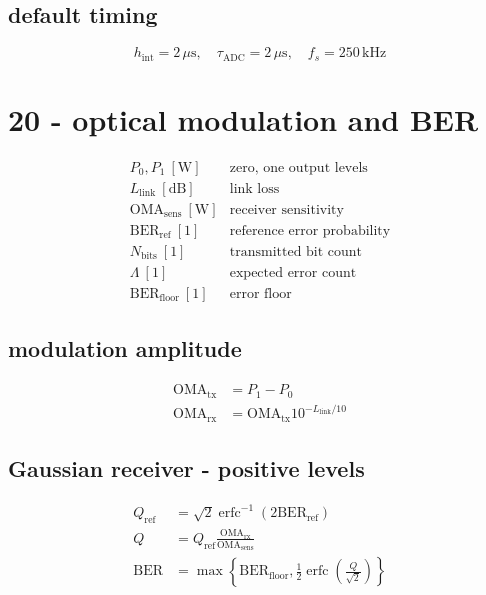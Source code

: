 \subsection*{default timing}
\[
\displaystyle h_{\mathrm{int}}=2\,\mu\mathrm s,\quad\tau_{\mathrm{ADC}}=2\,\mu\mathrm s,\quad f_s=250\,\mathrm{kHz}
\]

\clearpage
\section*{20 - optical modulation and BER}

\[
\begin{array}{ll}P_0,P_1\ [\mathrm W]&\text{zero, one output levels}\\[0.6em]L_{\mathrm{link}}\ [\mathrm{dB}]&\text{link loss}\\[0.6em]\mathrm{OMA}_{\mathrm{sens}}\ [\mathrm W]&\text{receiver sensitivity}\\[0.6em]\mathrm{BER}_{\mathrm{ref}}\ [1]&\text{reference error probability}\\[0.6em]N_{\mathrm{bits}}\ [1]&\text{transmitted bit count}\\[0.6em]\Lambda\ [1]&\text{expected error count}\\[0.6em]\mathrm{BER}_{\mathrm{floor}}\ [1]&\text{error floor}\end{array}
\]

\subsection*{modulation amplitude}
\[
\displaystyle \begin{aligned}\mathrm{OMA}_{\mathrm{tx}}&=P_1-P_0\\\mathrm{OMA}_{\mathrm{rx}}&=\mathrm{OMA}_{\mathrm{tx}}10^{-L_{\mathrm{link}}/10}\end{aligned}
\]

\subsection*{Gaussian receiver - positive levels}
\[
\displaystyle \begin{aligned}Q_{\mathrm{ref}}&=\sqrt2\operatorname{erfc}^{-1}(2\mathrm{BER}_{\mathrm{ref}})\\Q&=Q_{\mathrm{ref}}\frac{\mathrm{OMA}_{\mathrm{rx}}}{\mathrm{OMA}_{\mathrm{sens}}}\\\mathrm{BER}&=\max\!\left\{\mathrm{BER}_{\mathrm{floor}},\frac12\operatorname{erfc}\!\left(\frac Q{\sqrt2}\right)\right\}\end{aligned}
\]

